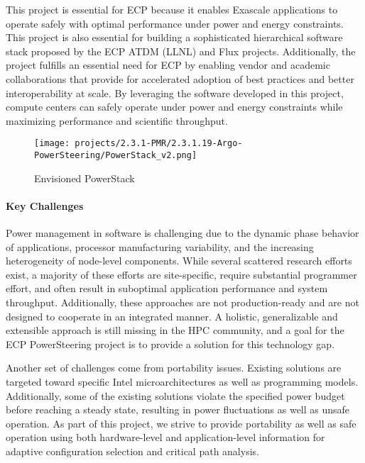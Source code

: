 This project is essential for ECP because it enables Exascale applications to operate safely with optimal performance under power and energy constraints. This project is also essential for building a sophisticated hierarchical software stack proposed by the ECP ATDM (LLNL) and Flux projects. Additionally, the project fulfills an essential need for ECP by enabling vendor and academic collaborations that provide for accelerated adoption of best practices and better interoperability at scale. By leveraging the software developed in this project, compute centers can safely operate under power and energy constraints while maximizing performance and scientific throughput. 

\begin{figure}[t]
	\centering
	\texttt{[image: projects/2.3.1-PMR/2.3.1.19-Argo-PowerSteering/PowerStack\_v2.png]}
	\caption{Envisioned PowerStack}
	\label{fig:pstack}
\end{figure}


\paragraph{Key Challenges}
Power management in software is challenging due to the dynamic phase behavior of applications, processor manufacturing variability, and the increasing heterogeneity of node-level components. While several scattered research efforts exist, a majority of these efforts are site-specific, require substantial programmer effort, and often result in suboptimal application performance and system throughput. Additionally, these approaches are not production-ready and are not designed to cooperate in an integrated manner. A holistic, generalizable and extensible approach is still missing in the HPC community, and a goal for the ECP PowerSteering project is to provide a solution for this technology gap. 

Another set of challenges come from portability issues. Existing solutions are targeted toward specific Intel microarchitectures as well as programming models. Additionally, some of the existing solutions  violate the specified power budget before reaching a steady state, resulting in power fluctuations as well as unsafe operation. As part of this project, we strive to provide portability as well as safe operation using both hardware-level and application-level information for adaptive configuration selection and critical path analysis.

